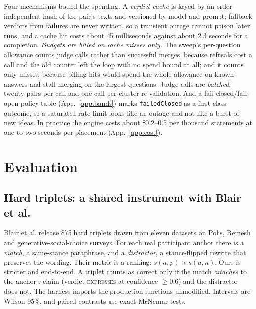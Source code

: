 \documentclass{article}
\newcommand{\bpt}{Blair et al.\xspace}
\begin{document}
\label{sec:costctl}
Four mechanisms bound the spending. A \emph{verdict cache} is keyed by an order-independent hash of the pair's texts and versioned by model and prompt; fallback verdicts from failures are never written, so a transient outage cannot poison later runs, and a cache hit costs about 45 milliseconds against about 2.3 seconds for a completion. \emph{Budgets are billed on cache misses only.} The sweep's per-question allowance counts judge calls rather than successful merges, because refusals cost a call and the old counter left the loop with no spend bound at all; and it counts only misses, because billing hits would spend the whole allowance on known answers and stall merging on the largest questions. Judge calls are \emph{batched}, twenty pairs per call and one call per cluster re-validation. And a fail-closed/fail-open policy table (App.~\ref{app:bands}) marks \texttt{failedClosed} as a first-class outcome, so a saturated rate limit looks like an outage and not like a burst of new ideas. In practice the engine costs about \$0.2--0.5 per thousand statements at one to two seconds per placement (App.~\ref{app:cost}).\label{sec:cost}

\section{Evaluation}
\label{sec:eval}

\subsection{Hard triplets: a shared instrument with \bpt}
\label{sec:triplets}
\bpt release 875 hard triplets drawn from eleven datasets on Polis, Remesh and generative-social-choice surveys. For each real participant anchor there is a \emph{match}, a same-stance paraphrase, and a \emph{distractor}, a stance-flipped rewrite that preserves the wording. Their metric is a ranking: $s(a,p)>s(a,n)$. Ours is stricter and end-to-end. A triplet counts as correct only if the match \emph{attaches} to the anchor's claim (verdict \textsc{expresses} at confidence $\ge0.6$) and the distractor does not. The harness imports the production functions unmodified. Intervals are Wilson 95\%, and paired contrasts use exact McNemar tests.
\end{document}
